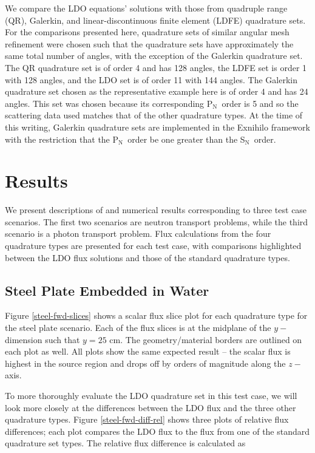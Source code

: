 \documentclass{article} %
\newcommand{\sn}{S$_\mathrm{N}$}
\newcommand{\pn}{P$_\mathrm{N}$}
\begin{document}
We compare the LDO equations' solutions with those from quadruple range (QR),
Galerkin, and linear-discontinuous finite element (LDFE) quadrature sets.
For the comparisons presented here, quadrature sets of similar angular mesh
refinement were chosen such that the quadrature sets have approximately the 
same total number of angles, with the exception of the Galerkin quadrature set.
The QR quadrature set is of order 4 and has 128 angles, the LDFE set is order 1
with 128 angles, and the LDO set is of order 11 with 144 angles. 
The Galerkin quadrature set chosen as the representative example here is of
order 4 and has 24 angles. This set was chosen because its corresponding \pn\
order is 5 and so the scattering data used matches that of the other quadrature
types. At the time of this writing, Galerkin quadrature sets are implemented in
the Exnihilo framework with the restriction that the \pn\ order be one greater
than the \sn\ order.

\section{Results}
\label{sec:results}

We present descriptions of and numerical results corresponding to three test
case scenarios. The first two scenarios are neutron transport problems, while
the third scenario is a photon transport problem. Flux calculations from the
four quadrature types are presented for each test case, with comparisons
highlighted between the LDO flux solutions and those of the standard
quadrature types.

\subsection{Steel Plate Embedded in Water}

Figure \ref{steel-fwd-slices} shows a scalar flux slice plot for each
quadrature type for the steel plate scenario.  Each of the flux slices is at
the midplane of the $y-$dimension such that $y = 25$ cm. The geometry/material
borders are outlined on each plot as well. All plots show the same expected
result -- the scalar flux is highest in the source region and drops off by
orders of magnitude along the $z-$axis.

To more thoroughly evaluate the LDO quadrature set in this test case, we will
look more closely at the differences between the LDO flux and
the three other quadrature types. Figure \ref{steel-fwd-diff-rel} shows three
plots of relative flux differences; each plot compares the LDO
flux to the flux from one of the standard quadrature set types. The relative
flux difference is calculated as
\end{document}
